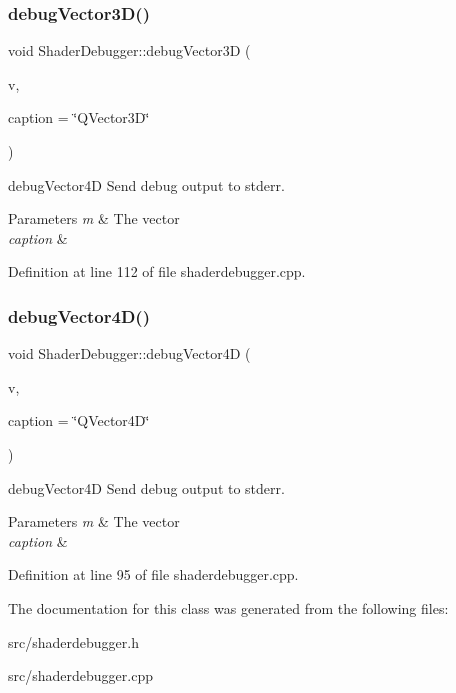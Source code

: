 \subsubsection{\texorpdfstring{debugVector3D()}{debugVector3D()}}
{\footnotesize\ttfamily void Shader\+Debugger\+::debug\+Vector3D (\begin{DoxyParamCaption}\item[{const Q\+Vector3D \&}]{v,  }\item[{const Q\+String \&}]{caption = {\ttfamily \char`\"{}QVector3D\char`\"{}} }\end{DoxyParamCaption})\hspace{0.3cm}{\ttfamily [static]}}



debug\+Vector4D Send debug output to stderr. 


\begin{DoxyParams}{Parameters}
{\em m} & The vector \\
\hline
{\em caption} & \\
\hline
\end{DoxyParams}


Definition at line 112 of file shaderdebugger.\+cpp.

\mbox{\label{class_shader_debugger_a457fa04849102556e946cafdf9ea553e}} 
\subsubsection{\texorpdfstring{debugVector4D()}{debugVector4D()}}
{\footnotesize\ttfamily void Shader\+Debugger\+::debug\+Vector4D (\begin{DoxyParamCaption}\item[{const Q\+Vector4D \&}]{v,  }\item[{const Q\+String \&}]{caption = {\ttfamily \char`\"{}QVector4D\char`\"{}} }\end{DoxyParamCaption})\hspace{0.3cm}{\ttfamily [static]}}



debug\+Vector4D Send debug output to stderr. 


\begin{DoxyParams}{Parameters}
{\em m} & The vector \\
\hline
{\em caption} & \\
\hline
\end{DoxyParams}


Definition at line 95 of file shaderdebugger.\+cpp.



The documentation for this class was generated from the following files\+:\begin{DoxyCompactItemize}
\item 
src/shaderdebugger.\+h\item 
src/shaderdebugger.\+cpp\end{DoxyCompactItemize}
